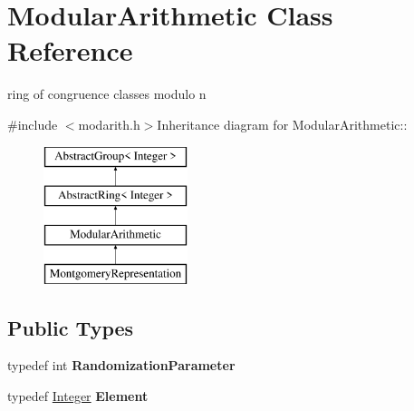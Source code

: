 \hypertarget{class_modular_arithmetic}{
\section{ModularArithmetic Class Reference}
\label{class_modular_arithmetic}
}


ring of congruence classes modulo n  


{\ttfamily \#include $<$modarith.h$>$}Inheritance diagram for ModularArithmetic::\begin{figure}[H]
\begin{center}
\leavevmode
\includegraphics[height=4cm]{class_modular_arithmetic}
\end{center}
\end{figure}
\subsection*{Public Types}
\begin{DoxyCompactItemize}
\item 
\hypertarget{class_modular_arithmetic_a872afa5efebf43e4744156dcdfac3ca3}{
typedef int {\bfseries RandomizationParameter}}
\label{class_modular_arithmetic_a872afa5efebf43e4744156dcdfac3ca3}

\item 
\hypertarget{class_modular_arithmetic_a17f2266382639dde45d028e630e07296}{
typedef \hyperlink{class_integer}{Integer} {\bfseries Element}}
\label{class_modular_arithmetic_a17f2266382639dde45d028e630e07296}

\end{DoxyCompactItemize}
